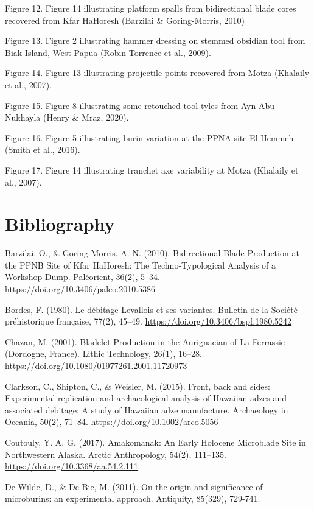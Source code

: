 \documentclass[
]{article}
\begin{document}
Figure 12. Figure 14 illustrating platform spalls from bidirectional
blade cores recovered from Kfar HaHoresh (Barzilai \& Goring-Morris,
2010)

Figure 13. Figure 2 illustrating hammer dressing on stemmed obsidian
tool from Biak Island, West Papua (Robin Torrence et al., 2009).

Figure 14. Figure 13 illustrating projectile points recovered from Motza
(Khalaily et al., 2007).

Figure 15. Figure 8 illustrating some retouched tool tyles from Ayn Abu
Nukhayla (Henry \& Mraz, 2020).

Figure 16. Figure 5 illustrating burin variation at the PPNA site El
Hemmeh (Smith et al., 2016).

Figure 17. Figure 14 illustrating tranchet axe variability at Motza
(Khalaily et al., 2007).

\hypertarget{bibliography}{%
\section{Bibliography}\label{bibliography}}

Barzilai, O., \& Goring-Morris, A. N. (2010). Bidirectional Blade
Production at the PPNB Site of Kfar HaHoresh: The Techno-Typological
Analysis of a Workshop Dump. Paléorient, 36(2), 5--34.
\url{https://doi.org/10.3406/paleo.2010.5386}

Bordes, F. (1980). Le débitage Levallois et ses variantes. Bulletin de
la Société préhistorique française, 77(2), 45--49.
\url{https://doi.org/10.3406/bspf.1980.5242}

Chazan, M. (2001). Bladelet Production in the Aurignacian of La
Ferrassie (Dordogne, France). Lithic Technology, 26(1), 16--28.
\url{https://doi.org/10.1080/01977261.2001.11720973}

Clarkson, C., Shipton, C., \& Weisler, M. (2015). Front, back and sides:
Experimental replication and archaeological analysis of Hawaiian adzes
and associated debitage: A study of Hawaiian adze manufacture.
Archaeology in Oceania, 50(2), 71--84.
\url{https://doi.org/10.1002/arco.5056}

Coutouly, Y. A. G. (2017). Amakomanak: An Early Holocene Microblade Site
in Northwestern Alaska. Arctic Anthropology, 54(2), 111--135.
\url{https://doi.org/10.3368/aa.54.2.111}

De Wilde, D., \& De Bie, M. (2011). On the origin and significance of
microburins: an experimental approach. Antiquity, 85(329), 729-741.
\end{document}

